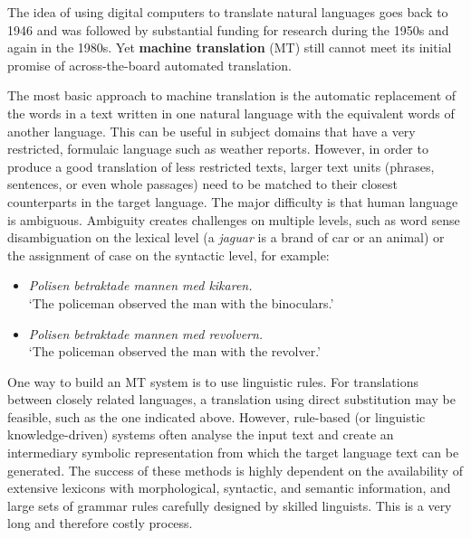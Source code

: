 \begin{multicols}{2}
The idea of using digital computers to translate natural languages goes back to 1946 and was followed by substantial funding for research during the 1950s and again in the 1980s. Yet \textbf{machine translation} (MT) still cannot meet its initial promise of across-the-board automated translation. 


The most basic approach to machine translation is the automatic replacement of the words in a text written in one natural language with the equivalent words of another language. This can be useful in subject domains that have a very restricted, formulaic language such as weather reports. However, in order to produce a good translation of less restricted texts, larger text units (phrases, sentences, or even whole passages) need to be matched to their closest counterparts in the target language. The major difficulty is that human language is ambiguous. Ambiguity creates challenges on multiple levels, such as word sense disambiguation on the lexical level (a \textit{jaguar} is a brand of car or an animal) or the assignment of case on the syntactic level, for example:

\begin{itemize}[itemsep=0pt,parsep=0pt]
\item \textit{Polisen betraktade mannen med kikaren.}
\\`The policeman observed the man with the binoculars.'
\item \textit{Polisen betraktade mannen med revolvern.}
\\`The policeman observed the man with the revolver.'
\end{itemize}

One way to build an MT system is to use linguistic rules. For translations between closely related languages, a translation using direct substitution may be feasible, such as the one indicated above. However, rule-based (or linguistic knowledge-driven) systems often analyse the input text and create an intermediary symbolic representation from which the target language text can be generated. The success of these methods is highly dependent on the availability of extensive lexicons with morphological, syntactic, and semantic information, and large sets of grammar rules carefully designed by skilled linguists. This is a very long and therefore costly process.


\end{multicols}
